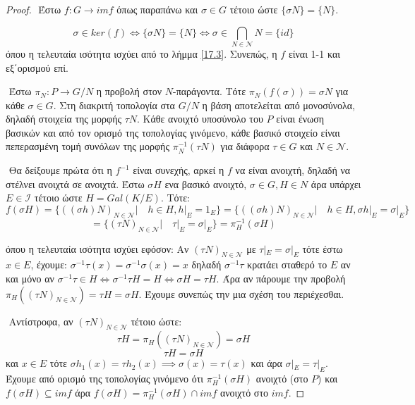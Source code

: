 \documentclass[oneside,a4paper]{article}
\begin{document}
\begin{proof}
$ $\newline
\noindent Έστω $f: G \rightarrow imf$ όπως παραπάνω και $\sigma \in G$ τέτοιο ώστε $\{\sigma N \} = \{ N\}$.

$$\sigma \in ker(f) \iff \{\sigma N\} = \{N \} \iff \sigma \in \bigcap_{N \in \mathcal{N}}N = \{id\}$$
όπου η τελευταία ισότητα ισχύει από το λήμμα \ref{17.3}. Συνεπώς, η $f$ είναι 1-1 και εξ΄ορισμού επί. 

$ $\newline
\noindent Έστω $\pi_N : P \rightarrow G/N$ η προβολή στον $N$-παράγοντα. Τότε $\pi_N (f(\sigma)) = \sigma N$ για κάθε $\sigma \in G$. Στη διακριτή τοπολογία στα $G/N$ η βάση αποτελείται από μονοσύνολα, δηλαδή στοιχεία της μορφής $\tau N$. Κάθε ανοιχτό υποσύνολο του $P$ είναι ένωση βασικών και από τον ορισμό της τοπολογίας γινόμενο, κάθε βασικό στοιχείο είναι πεπερασμένη τομή συνόλων της μορφής $\pi^{-1}_N (\tau N)$ για διάφορα $\tau \in G$ και $N \in \mathcal{N}$. 








$ $\newline
\noindent Θα δείξουμε πρώτα ότι η $f^{-1}$ είναι συνεχής, αρκεί η $f$ να είναι ανοιχτή, δηλαδή να στέλνει ανοιχτά σε ανοιχτά. Έστω $\sigma H$ ενα βασικό ανοιχτό, $\sigma \in G , H \in N$ άρα υπάρχει $E \in \mathcal{I}$ τέτοιο ώστε $H = Gal(K/E)$. Τότε:
$$f(\sigma H) = \{\left(\left(\sigma h \right)N\right)_{N \in \mathcal{N}}| \quad h \in H, h|_E = 1_E\} = \{\left(\left(\sigma h \right)N\right)_{N \in \mathcal{N}}| \quad h \in H, \sigma h|_E = \sigma|_E\}$$
$$= \{\left( \tau N\right)_{N \in \mathcal{N}}| \quad \tau|_E = \sigma|_E\} = \pi^{-1}_H (\sigma H)$$

όπου η τελευταία ισότητα ισχύει εφόσον:
Αν $(\tau N)_{N \in \mathcal{N}}$ με $\tau |_E = \sigma |_E$ τότε έστω $x \in E$, έχουμε: $\sigma^{-1} \tau (x) = \sigma^{-1} \sigma (x) = x$ δηλαδή $\sigma^{-1} \tau$ κρατάει σταθερό το $E$ αν και μόνο αν $\sigma^{-1} \tau \in H \iff \sigma^{-1} \tau H = H \iff \sigma H = \tau H$. Άρα αν πάρουμε την προβολή $\pi_H \left( \left(\tau N \right)_{N \in \mathcal{N}}\right) = \tau H = \sigma H$. Έχουμε συνεπώς την μια σχέση του περιέχεσθαι.

$ $\newline
\noindent Αντίστροφα, αν $(\tau N)_{N \in \mathcal{N}}$ τέτοιο ώστε:
$$\tau H = \pi_H \left( \left(\tau N \right)_{N \in \mathcal{N}}\right) = \sigma H$$
$$\tau H = \sigma H$$
και $x \in E$ τότε $\sigma h_1 (x) = \tau h_2 (x) \implies \sigma (x) = \tau (x)$ και άρα $\sigma|_E = \tau|_E$.
Έχουμε από ορισμό της τοπολογίας γινόμενο ότι $\pi^{-1}_H (\sigma H)$ ανοιχτό (στο $P$) και $f(\sigma H) \subseteq imf$ άρα $f(\sigma H) = \pi^{-1}_H (\sigma H) \cap imf$ ανοιχτό στο $imf$.


\end{proof}
\end{document}
